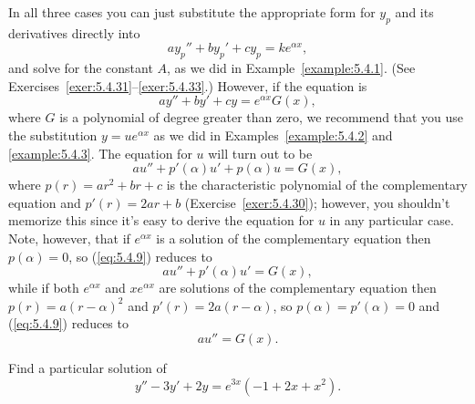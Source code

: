 In all three cases you can just substitute the appropriate form for $y_{p}$ and its derivatives
directly into
\[
  ay_{p}''+by_{p}'+cy_{p}=ke^{\alpha x},
\]
and solve for the constant $A$, as we did in Example~\ref{example:5.4.1}. (See
Exercises~\ref{exer:5.4.31}--\ref{exer:5.4.33}.) However, if the equation is
\[
  ay''+by'+cy=e^{\alpha x}G(x),
\]
where $G$ is a polynomial of degree greater than zero, we recommend that you use the substitution
$y=ue^{\alpha x}$ as we did in Examples~\ref{example:5.4.2} and \ref{example:5.4.3}. The equation
for $u$ will turn out to be
\begin{equation}
  \label{eq:5.4.9}au''+p'(\alpha)u'+p(\alpha)u=G(x),
\end{equation}
where $p(r)=ar^{2}+br+c$ is the characteristic polynomial of the complementary equation and
$p'(r)=2ar+b$ (Exercise~\ref{exer:5.4.30}); however, you shouldn't memorize this since it's easy to
derive the equation for $u$ in any particular case. Note, however, that if $e^{\alpha x}$ is a
solution of the complementary equation then $p(\alpha)=0$, so (\ref{eq:5.4.9}) reduces to
\[
  au''+p'(\alpha)u'=G(x),
\]
while if both $e^{\alpha x}$ and $xe^{\alpha x}$ are solutions of the complementary equation then
$p(r)=a(r-\alpha)^{2}$ and $p'(r)=2a(r-\alpha)$, so $p(\alpha)=p'(\alpha)=0$ and (\ref{eq:5.4.9})
reduces to
\[
  au''=G(x).
\]

\begin{example}
  \label{example:5.4.4} \rm Find a particular solution of
  \begin{equation}
    \label{eq:5.4.10}y''-3y'+2y=e^{3x}(-1+2x+x^{2}).
  \end{equation}
\end{example}

